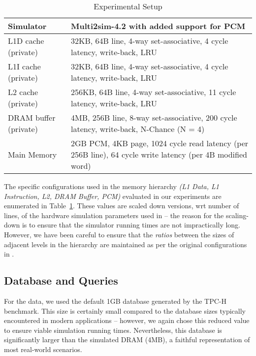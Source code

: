 \begin{center}
\begin{table}[t]
\begin{small}
\caption{Experimental Setup}
\label{table:setup}
\begin{tabular}{p{3cm}p{9cm}}
\toprule
Simulator & Multi2sim-4.2 with added support for PCM\\ \hline

L1D cache (private) & 32KB, 64B line, 4-way set-associative, 4 cycle latency, write-back, LRU\\ \hline
L1I cache (private) & 32KB, 64B line, 4-way set-associative, 4 cycle latency, write-back, LRU\\ \hline   
L2 cache (private) & 256KB, 64B line, 4-way set-associative, 11 cycle latency, write-back, LRU\\ \hline

DRAM buffer (private) & 4MB, 256B line, 8-way set-associative, 200 cycle latency, write-back, N-Chance (N = 4)\\ \hline

Main Memory & 2GB PCM, 4KB page, 1024 cycle read latency (per 256B line), 64 cycle write latency (per 4B modified word)\\ \bottomrule
\end{tabular}
\end{small}
\end{table}
\end{center}

\vspace{-0.4in}
The specific configurations used in the memory hierarchy \emph{(L1 Data,
L1 Instruction, L2, DRAM Buffer, PCM)} evaluated in our experiments are
enumerated in Table~\ref{table:setup}.  These values are scaled down
versions, wrt number of lines, of the hardware simulation parameters used
in \cite{wear} -- the reason for the scaling-down is to ensure that the
simulator running times are not impractically long. However, we have been
careful to ensure that the \emph{ratios} between the sizes of adjacent
levels in the hierarchy are maintained as per the original configurations
in \cite{wear}.  


\subsection{Database and Queries}
For the data, we used the default 1GB database generated by the TPC-H
benchmark.  This size is certainly small compared to the database sizes
typically encountered in modern applications -- however, we again chose
this reduced value to ensure viable simulation running times. Nevertheless, this database is significantly larger than the simulated DRAM (4MB), a faithful representation of most real-world scenarios.

